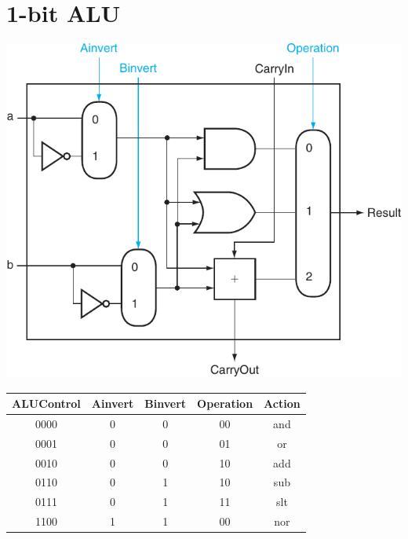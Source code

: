 \documentclass[11pt]{article}
\begin{document}
\begin{minipage}[t]{0.35\linewidth}
    \section*{1-bit ALU}
    \includegraphics[width=\linewidth]{content/alu.pdf}
    \begin{center}
        \begin{tabular}[t]{c|ccc|c}
            \toprule
            ALUControl & Ainvert & Binvert & Operation & Action \\
            \midrule
            {0000} & 0       & 0       & 00        & and    \\
            {0001} & 0       & 0       & 01        & or     \\
            {0010} & 0       & 0       & 10        & add    \\
            {0110} & 0       & 1       & 10        & sub    \\
            {0111} & 0       & 1       & 11        & slt    \\
            {1100} & 1       & 1       & 00        & nor    \\
            \bottomrule
        \end{tabular}
    \end{center}
\end{minipage}

\vfill
\end{document}
